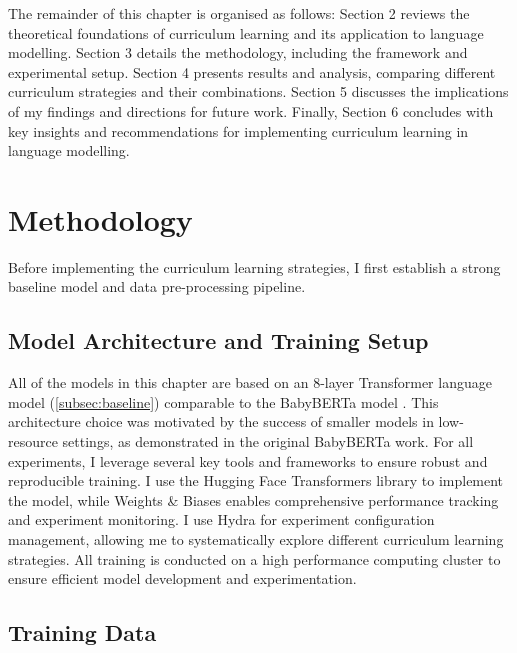 The remainder of this chapter is organised as follows: Section 2 reviews the theoretical foundations of curriculum learning and its application to language modelling. Section 3 details the methodology, including the \climb framework and experimental setup. Section 4 presents results and analysis, comparing different curriculum strategies and their combinations. Section 5 discusses the implications of my findings and directions for future work. Finally, Section 6 concludes with key insights and recommendations for implementing curriculum learning in language modelling.

\section{Methodology}

Before implementing the curriculum learning strategies, I first establish a strong baseline model and data pre-processing pipeline. 

\subsection{Model Architecture and Training Setup}
All of the models in this chapter are based on an 8-layer Transformer language model (\cref{subsec:baseline}) comparable to the BabyBERTa model \citep{huebner2021babyberta}. This architecture choice was motivated by the success of smaller models in low-resource settings, as demonstrated in the original BabyBERTa work. For all experiments, I leverage several key tools and frameworks to ensure robust and reproducible training. I use the Hugging Face Transformers library \citep{transformers} to implement the model, while Weights \& Biases \citep{wandb} enables comprehensive performance tracking and experiment monitoring. I use Hydra \citep{hydra} for experiment configuration management, allowing me to systematically explore different curriculum learning strategies. All training is conducted on a high performance computing cluster to ensure efficient model development and experimentation.

\subsection{Training Data}
\label{subsec:data}

